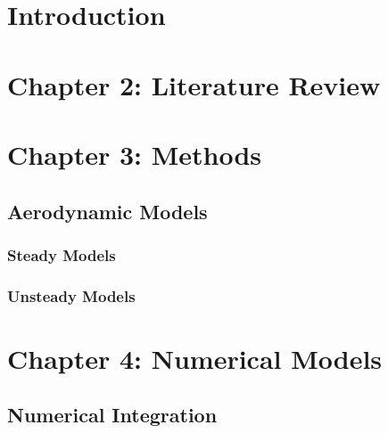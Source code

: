 \documentclass[12pt]{uthesis-v12}  %
\begin{document}
\chapter{Introduction}


\chapter{Chapter 2: Literature Review}



% 

\chapter{Chapter 3: Methods}

\section{Aerodynamic Models}
\subsection{Steady Models}



\subsection{Unsteady Models}

\chapter{Chapter 4: Numerical Models}
\section{Numerical Integration}



 

\end{document}
